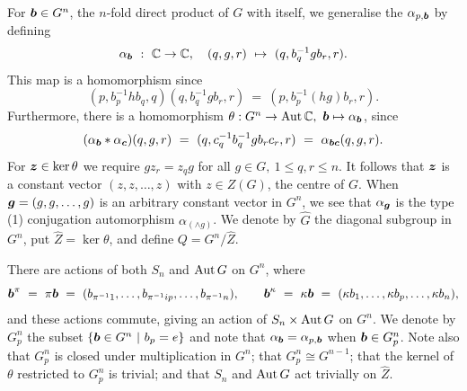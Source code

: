 \noindent
For $\boldsymbol{b} \in G^n$, the $n$-fold direct product of $G$ with itself, 
we generalise the $\alpha_{p,\boldsymbol{b}}$ by defining 
$$
\alpha_{\boldsymbol{b}} ~:~ \mathbb{C} \to \mathbb{C}, \quad 
(q,g,r) ~\mapsto~ (q,b_q^{-1}gb_r,r). 
$$
This map is a homomorphism since 
$$
(p,b_p^{-1}hb_q,q)(q,b_q^{-1}gb_r,r) ~=~ (p,b_p^{-1}(hg)b_r,r).
$$
Furthermore, there is a homomorphism 
$\theta : G^n \to \mathrm{Aut}\,\mathbb{C},~ \boldsymbol{b} \mapsto \alpha_{\boldsymbol{b}}$, since 
$$
(\alpha_{\boldsymbol{b}} * \alpha_{\boldsymbol{c}})(q,g,r) 
~=~ (q,c^{-1}_qb^{-1}_qgb_rc_r,r) 
~=~ \alpha_{\boldsymbol{b}\boldsymbol{c}}(q,g,r). 
$$
For $\boldsymbol{z} \in \ker\theta$ we require 
$gz_r = z_qg$ for all $g \in G,~ 1 \leqslant q,r \leqslant n$. 
It follows that $\boldsymbol{z}$ is a constant vector $(z,z,\ldots,z)$ 
with $z \in Z(G)$, the centre of $G$. 
When $\boldsymbol{g} = (g,g,\ldots,g)$ is an arbitrary constant vector in $G^n$, 
we see that $\alpha_{\boldsymbol{g}}$ is the type (1) conjugation automorphism 
$\alpha_{(\wedge  g)}$. 
We denote by $\hat{G}$ the diagonal subgroup in $G^n$, 
put $\hat{Z} = \ker\theta$, and define $Q = G^n/\hat{Z}$. 

\medskip\noindent
There are actions of both $S_n$ and $\mathrm{Aut}\,G$ on $G^n$, where
\begin{equation} \label{eq:pi-kappa-actions}
\boldsymbol{b}^{\pi} ~=~ \pi\boldsymbol{b} ~=~ 
(b_{\pi^{-1}1},\ldots,b_{\pi^{-1}ip},\ldots,b_{\pi^{-1}n}), 
\qquad
\boldsymbol{b}^{\kappa} ~=~ \kappa\boldsymbol{b} 
               ~=~ (\kappa b_1,\ldots,\kappa b_p,\ldots,\kappa b_n), 
\end{equation}
and these actions commute, giving an action of $S_n \times \mathrm{Aut}\,G$ on $G^n$. 
We denote by $G^n_p$ the subset $\{\boldsymbol{b} \in G^n ~|~ b_p=e\}$ 
and note that $\alpha_{\boldsymbol{b}} = \alpha_{p,\boldsymbol{b}}$ when $\boldsymbol{b} \in G^n_p$. 
Note also that $G^n_p$ is closed under multiplication in $G^n$; 
that $G^n_p \cong G^{n-1}$; 
that the kernel of $\theta$ restricted to $G^n_p$ is trivial; 
and that $S_n$ and $\mathrm{Aut}\,G$ act trivially on $\hat{Z}$. 
% 

